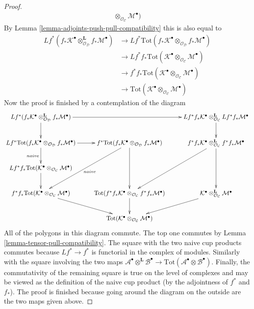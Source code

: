 \documentclass[10pt,a4paper]{amsart}
\theoremstyle{plain}
\theoremstyle{definition}
\theoremstyle{remark}
\numberwithin{equation}{subsection}
\begin{document}
\begin{proof}
\begin{align*}
\otimes_{\mathcal{O}_\mathcal{C}}
\mathcal{M}^\bullet)
\end{align*}
By Lemma \ref{lemma-adjoints-push-pull-compatibility} this is also equal to
\begin{align*}
Lf^*(f_*\mathcal{K}^\bullet
\otimes_{\mathcal{O}_\mathcal{D}}^\mathbf{L}
f_*\mathcal{M}^\bullet)
& \to
Lf^*\text{Tot}(
f_*\mathcal{K}^\bullet
\otimes_{\mathcal{O}_\mathcal{D}}
f_*\mathcal{M}^\bullet) \\
& \to
Lf^*f_*\text{Tot}(\mathcal{K}^\bullet
\otimes_{\mathcal{O}_\mathcal{C}}
\mathcal{M}^\bullet) \\
& \to
f^*f_*\text{Tot}(\mathcal{K}^\bullet
\otimes_{\mathcal{O}_\mathcal{C}}
\mathcal{M}^\bullet) \\
& \to
\text{Tot}(\mathcal{K}^\bullet
\otimes_{\mathcal{O}_\mathcal{C}}
\mathcal{M}^\bullet)
\end{align*}
Now the proof is finished by a contemplation of the diagram
$$
\xymatrix{
Lf^*(f_*\mathcal{K}^\bullet
\otimes_{\mathcal{O}_\mathcal{D}}^\mathbf{L}
f_*\mathcal{M}^\bullet) \ar[d] \ar[rr] & &
Lf^*f_*\mathcal{K}^\bullet \otimes_{\mathcal{O}_\mathcal{C}}^\mathbf{L}
Lf^*f_*\mathcal{M}^\bullet \ar[d] \\
Lf^*\text{Tot}(
f_*\mathcal{K}^\bullet
\otimes_{\mathcal{O}_\mathcal{D}}
f_*\mathcal{M}^\bullet) \ar[d]_{naive} \ar[r] &
f^*\text{Tot}(
f_*\mathcal{K}^\bullet
\otimes_{\mathcal{O}_\mathcal{D}}
f_*\mathcal{M}^\bullet) \ar[ldd]^{naive} \ar[dd] &
f^*f_*\mathcal{K}^\bullet \otimes_{\mathcal{O}_\mathcal{C}}^\mathbf{L}
f^*f_*\mathcal{M}^\bullet \ar[dd] \ar[ldd] \\
Lf^*f_*\text{Tot}(\mathcal{K}^\bullet
\otimes_{\mathcal{O}_\mathcal{C}}
\mathcal{M}^\bullet) \ar[d] \\
f^*f_*\text{Tot}(\mathcal{K}^\bullet \otimes_{\mathcal{O}_\mathcal{C}}
\mathcal{M}^\bullet) \ar[rd] &
\text{Tot}(f^*f_*\mathcal{K}^\bullet \otimes_{\mathcal{O}_\mathcal{C}}
f^*f_*\mathcal{M}^\bullet) \ar[d] &
\mathcal{K}^\bullet \otimes_{\mathcal{O}_\mathcal{C}}^\mathbf{L}
\mathcal{M}^\bullet \ar[ld] \\
& \text{Tot}(\mathcal{K}^\bullet
\otimes_{\mathcal{O}_\mathcal{C}}
\mathcal{M}^\bullet)
}
$$
All of the polygons in this diagram commute. The top one commutes
by Lemma \ref{lemma-tensor-pull-compatibility}.
The square with the two naive cup products commutes because
$Lf^* \to f^*$ is functorial in the complex of modules.
Similarly with the square involving the two maps
$\mathcal{A}^\bullet \otimes^\mathbf{L} \mathcal{B}^\bullet \to
\text{Tot}(\mathcal{A}^\bullet \otimes \mathcal{B}^\bullet)$.
Finally, the commutativity of the remaining square
is true on the level of complexes and may be viewed as the
definition of the naive cup product (by the adjointness
of $f^*$ and $f_*$). The proof is finished because
going around the diagram on the outside are the two maps
given above.
\end{proof}
\end{document}
